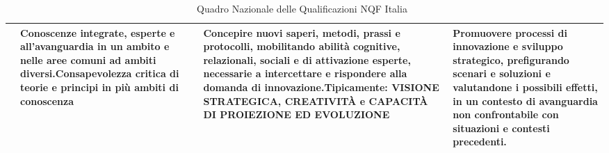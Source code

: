 \begin{sidewaystable}
\begin{adjustbox}{max width=\textwidth}
\begin{tabular}{@{}>{\centering\arraybackslash}p{1.0cm}p{6cm}p{12cm}p{12cm}}
\midrule
8&Conoscenze integrate, esperte e all'avanguardia in un ambito e nelle aree comuni ad ambiti diversi.Consapevolezza critica di teorie e principi in più ambiti di conoscenza&Concepire nuovi saperi, metodi, prassi e protocolli, mobilitando abilità cognitive, relazionali, sociali e di attivazione esperte, necessarie a intercettare e rispondere alla domanda di innovazione.Tipicamente: VISIONE STRATEGICA, CREATIVITÀ e CAPACITÀ DI PROIEZIONE ED EVOLUZIONE&Promuovere processi di innovazione e sviluppo strategico, prefigurando scenari e soluzioni e valutandone i possibili effetti, in un contesto di avanguardia non confrontabile con situazioni e contesti precedenti.\\
\bottomrule
\end{tabular}
\end{adjustbox}
\caption[Quadro Nazionale delle Qualificazioni NQF Italia]{Quadro Nazionale delle Qualificazioni NQF Italia~\cite{DL2018}}
\end{sidewaystable}

